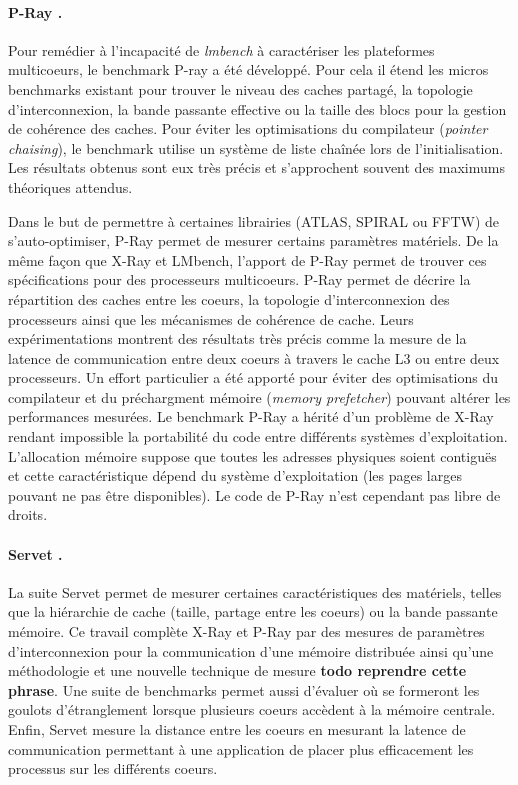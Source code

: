         \paragraph{P-Ray \cite{Duchateau2008}.} 
        
             
            Pour remédier à l'incapacité de \textit{lmbench} à caractériser les plateformes multicoeurs, le benchmark P-ray a été développé. Pour cela il étend les micros benchmarks existant pour trouver le niveau des caches partagé, la topologie d’interconnexion, la bande passante effective ou la taille des blocs pour la gestion de cohérence des caches. Pour éviter les optimisations du compilateur (\textit{pointer chaising}), le benchmark utilise un système de liste chaînée lors de l'initialisation. Les résultats obtenus sont eux très précis et s'approchent souvent des maximums théoriques attendus.

            Dans le but de permettre à certaines librairies (ATLAS, SPIRAL ou FFTW) de s'auto-optimiser, P-Ray permet de mesurer certains paramètres matériels. De la même façon que X-Ray et LMbench, l'apport de P-Ray permet de trouver ces spécifications pour des processeurs multicoeurs. P-Ray permet de décrire la répartition des caches entre les coeurs, la topologie d'interconnexion des processeurs ainsi que les mécanismes de cohérence de cache. Leurs expérimentations montrent des résultats très précis comme la mesure de la latence de communication entre deux coeurs à travers le cache L3 ou entre deux processeurs. Un effort particulier a été apporté pour éviter des optimisations du compilateur et du préchargment mémoire (\textit{memory prefetcher}) pouvant altérer les performances mesurées. Le benchmark P-Ray a hérité d'un problème de X-Ray rendant impossible la portabilité du code entre différents systèmes d'exploitation. L'allocation mémoire suppose que toutes les adresses physiques soient contiguës et cette caractéristique dépend du système d'exploitation (les pages larges pouvant ne pas être disponibles). Le code de P-Ray n'est cependant pas libre de droits.
        
        \paragraph{Servet \cite{gonzalez2010servet}.} 
            La suite Servet permet de mesurer certaines caractéristiques des matériels, telles que la hiérarchie de cache (taille, partage entre les coeurs) ou la bande passante mémoire. Ce travail complète X-Ray et P-Ray par des mesures de paramètres d'interconnexion pour la communication d'une mémoire distribuée ainsi qu'une méthodologie et une nouvelle technique de mesure \textbf{todo reprendre cette phrase}. Une suite de benchmarks permet aussi d'évaluer où se formeront les goulots d'étranglement lorsque plusieurs coeurs accèdent à la mémoire centrale. Enfin, Servet mesure la distance entre les coeurs en mesurant la latence de communication permettant à une application de placer plus efficacement les processus sur les différents coeurs.
               
